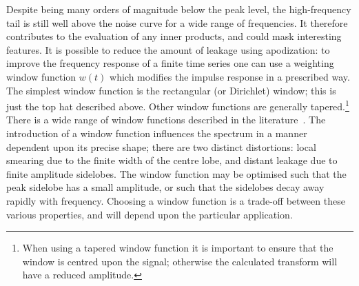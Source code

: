 Despite being many orders of magnitude below the peak level, the high-frequency tail is still well above the noise curve for a wide range of frequencies. It therefore contributes to the evaluation of any inner products, and could mask interesting features.  It is possible to reduce the amount of leakage using apodization: to improve the frequency response of a finite time series one can use a weighting window function $w(t)$ which modifies the impulse response in a prescribed way. The simplest window function is the rectangular (or Dirichlet) window; this is just the top hat described above. Other window functions are generally tapered.\footnote{When using a tapered window function it is important to ensure that the window is centred upon the signal; otherwise the calculated transform will have a reduced amplitude.} There is a wide range of window functions described in the literature~\citep{Harris1978,Kaiser1980,Nuttall1981,McKechan2010}. The introduction of a window function influences the spectrum in a manner dependent upon its precise shape; there are two distinct distortions: local smearing due to the finite width of the centre lobe, and distant leakage due to finite amplitude sidelobes. The window function may be optimised such that the peak sidelobe has a small amplitude, or such that the sidelobes decay away rapidly with frequency. Choosing a window function is a trade-off between these various properties, and will depend upon the particular application.

